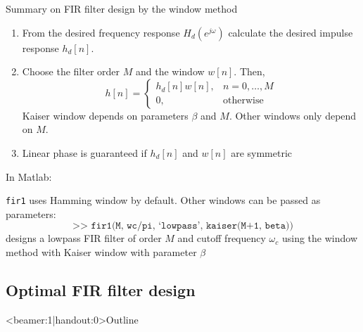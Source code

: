\documentclass[10pt, aspectratio=169]{beamer}
\begin{document}
%
\begin{frame}{Summary on FIR filter design by the window method}
	\begin{enumerate}
		\item From the desired frequency response $H_d(e^{j\omega})$ calculate the desired impulse response $h_d[n]$.
		\item Choose the filter order $M$ and the window $w[n]$. Then,
		\begin{equation*}
			h[n] = \begin{cases}
			h_d[n]w[n], & n = 0, \ldots, M \\
			0, &\text{otherwise}
			\end{cases} \tag{for $h_d[n]$ causal}
		\end{equation*}
		Kaiser window depends on parameters $\beta$ and $M$. Other windows only depend on $M$.
		
		\item Linear phase is guaranteed if $h_d[n]$ and $w[n]$ are symmetric
	\end{enumerate}

In Matlab: 

\texttt{fir1} uses Hamming window by default. Other windows can be passed as parameters:
\begin{equation*}
\texttt{>> fir1(M, wc/pi, `lowpass', kaiser(M+1, beta))}
\end{equation*} 
designs a lowpass FIR filter of order $M$ and cutoff frequency $\omega_c$ using the window method with Kaiser window with parameter $\beta$
\end{frame}

\subsection{Optimal FIR filter design}
\begin{frame}<beamer:1|handout:0>{Outline}
	\tableofcontents[currentsubsection]
\end{frame}
\end{document}
